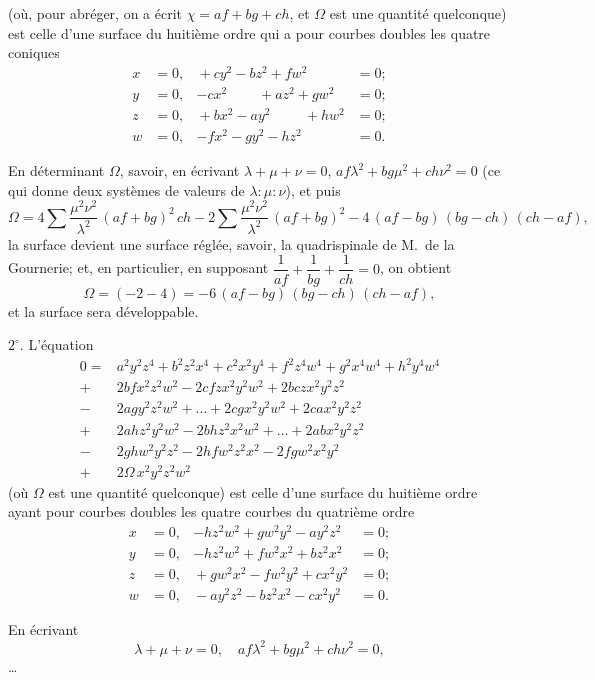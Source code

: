 \documentclass[11pt,a4paper]{article}
\theoremstyle{plain}
\theoremstyle{definition}
\begin{document}
\clearpage

(o\`u, pour abr\'eger, on a \'ecrit $\chi = af + bg + ch$, et $\Omega$ est une quantit\'e quelconque) est
celle d'une surface du huiti\`eme ordre qui a pour courbes doubles les quatre coniques
\begin{align*}
x &= 0, & {} +c y^2 - b z^2 + f w^2 &= 0; \\
y &= 0, & -c x^2 \phantom{+ay^2} + a z^2 + g w^2 &= 0; \\
z &= 0, & {} +b x^2 - a y^2 \phantom{+gw^2} + h w^2 &= 0; \\
w &= 0, & -f x^2 - g y^2 - h z^2 &= 0.
\end{align*}

En d\'eterminant $\Omega$, savoir, en \'ecrivant $\lambda + \mu + \nu = 0$, $af\lambda^2 + bg\mu^2 + ch\nu^2 = 0$ (ce qui
donne deux syst\`emes de valeurs de $\lambda : \mu : \nu$), et puis
\[
\Omega = 4 \sum \frac{\mu^2 \nu^2}{\lambda^2}\,(af + bg)^2\,ch
- 2 \sum \frac{\mu^2 \nu^2}{\lambda^2}\,(af + bg)^2
- 4\,(af - bg)\,(bg - ch)\,(ch - af),
\]
la surface devient une surface r\'egl\'ee, savoir, la quadrispinale de M.\ de la Gournerie;
et, en particulier, en supposant $\dfrac{1}{af} + \dfrac{1}{bg} + \dfrac{1}{ch} = 0$, on obtient
\[
\Omega = (-2 - 4) = -6\,(af - bg)\,(bg - ch)\,(ch - af),
\]
et la surface sera d\'eveloppable.

\medskip\noindent
$2^\circ$.  L'\'equation
\begin{align*}
0 = {}& a^2 y^2 z^4 + b^2 z^2 x^4 + c^2 x^2 y^4 + f^2 z^4 w^4 + g^2 x^4 w^4 + h^2 y^4 w^4 \\
{}+{}& 2bf x^2 z^2 w^2 - 2c f z x^2 y^2 w^2 + 2bc z x^2 y^2 z^2 \\
{}-{}& 2ag y^2 z^2 w^2 + \ldots + 2c g x^2 y^2 w^2 + 2 c a x^2 y^2 z^2 \\
{}+{}& 2ah z^2 y^2 w^2 - 2bh z^2 x^2 w^2 + \ldots + 2ab x^2 y^2 z^2 \\
{}-{}& 2gh w^2 y^2 z^2 - 2hf w^2 z^2 x^2 - 2fg w^2 x^2 y^2 \\
{}+{}& 2\Omega\, x^2 y^2 z^2 w^2
\end{align*}
(o\`u $\Omega$ est une quantit\'e quelconque) est celle d'une surface du huiti\`eme ordre ayant
pour courbes doubles les quatre courbes du quatri\`eme ordre
\begin{align*}
x &= 0, & -h z^2 w^2 + g w^2 y^2 - a y^2 z^2 &= 0; \\
y &= 0, & -h z^2 w^2 + f w^2 x^2 + b z^2 x^2 &= 0; \\
z &= 0, & {} + g w^2 x^2 - f w^2 y^2 + c x^2 y^2 &= 0; \\
w &= 0, & {} - a y^2 z^2 - b z^2 x^2 - c x^2 y^2 &= 0.
\end{align*}

En \'ecrivant
\[
\lambda + \mu + \nu = 0, \quad af\lambda^2 + bg\mu^2 + ch\nu^2 = 0,
\]
\dots
\end{document}
